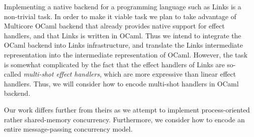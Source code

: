 \documentclass[12pt,mscres,cdtppar,twoside,openright,logo,rightchapter,normalheadings]{infthesis}
\theoremstyle{definition}
\newcommand{\todo}[1]{{\par\noindent\small\color{red} \framebox{\parbox{\dimexpr\linewidth-2\fboxsep-2\fboxrule}{\textbf{TODO:} #1}}}}
\begin{document}
Implementing a native backend for a programming language such as Links
is a non-trivial task. In order to make it viable task we plan to take
advantage of Multicore OCaml backend that already provides native
support for effect handlers, and that Links is written in OCaml. Thus
we intend to integrate the OCaml backend into Links infrastructure,
and translate the Links intermediate representation into the
intermediate representation of OCaml. However, the task is somewhat
complicated by the fact that the effect handlers of Links are
so-called \emph{multi-shot effect handlers}, which are more expressive
than linear effect handlers. Thus, we will consider how to encode
multi-shot handlers in OCaml backend.

Our work differs further from theirs as we attempt to implement
process-oriented rather shared-memory concurrency. Furthermore, we
consider how to encode an entire message-passing concurrency model.






\end{document}
